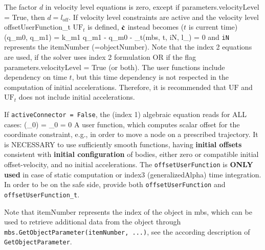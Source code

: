     \ee
    The factor $d$ in velocity level equations is zero, except if parameters.velocityLevel = True, then $d=l_\mathrm{off}$.
    If velocity level constraints are active and the velocity level offsetUserFunction\_t $\mathrm{UF}_t$ is defined, $\dot {\mathbf{c}}$ instead becomes ($t$ is current time)
    \be
      \dot \cv(\dot q_{m0}, \dot q_{m1}) = k_{m1} \cdot \dot q_{m1} - \dot q_{m0} - _t(mbs, t, iN, l_) = 0
    \ee
    and \texttt{iN} represents the itemNumber (=objectNumber).
    Note that the index 2 equations are used, if the solver uses index 2 formulation OR if the flag parameters.velocityLevel = True (or both).
    The user functions include dependency on time $t$, but this time dependency is not respected in the computation of initial accelerations. Therefore,
    it is recommended that $\mathrm{UF}$ and $\mathrm{UF}_t$ does not include initial accelerations.

    If \texttt{activeConnector = False}, the (index 1) algebraic equation reads for ALL cases:
    \be
      \cv(\lambda_0) = \lambda_0 = 0
    \ee
    A user function, which computes scalar offset for the coordinate constraint, e.g., in order to move a node on a prescribed trajectory.
    It is NECESSARY to use sufficiently smooth functions, having {\bf initial offsets} consistent with {\bf initial configuration} of bodies, 
    either zero or compatible initial offset-velocity, and no initial accelerations.
    The \texttt{offsetUserFunction} is {\bf ONLY used} in case of static computation or index3 (generalizedAlpha) time integration.
    In order to be on the safe side, provide both  \texttt{offsetUserFunction} and  \texttt{offsetUserFunction\_t}.

    Note that itemNumber represents the index of the object in mbs, which can be used to retrieve additional data from the object through
    \texttt{mbs.GetObjectParameter(itemNumber, ...)}, see the according description of \texttt{GetObjectParameter}.

